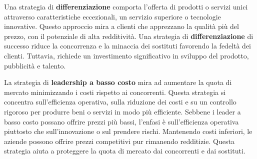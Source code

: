 \documentclass{article}
\begin{document}
Una strategia di \textbf{differenziazione} comporta l’offerta di prodotti o servizi unici attraverso caratteristiche eccezionali, un servizio superiore o tecnologie innovative. Questo approccio mira a clienti che apprezzano la qualità più del prezzo, con il potenziale di alta redditività. Una strategia di \textbf{differenziazione} di successo riduce la concorrenza e la minaccia dei sostituti favorendo la fedeltà dei clienti. Tuttavia, richiede un investimento significativo in sviluppo del prodotto, pubblicità e talento.

La strategia di \textbf{leadership a basso costo} mira ad aumentare la quota di mercato minimizzando i costi rispetto ai concorrenti. Questa strategia si concentra sull'efficienza operativa, sulla riduzione dei costi e su un controllo rigoroso per produrre beni o servizi in modo più efficiente. Sebbene i leader a basso costo possano offrire prezzi più bassi, l'enfasi è sull'efficienza operativa piuttosto che sull'innovazione o sul prendere rischi. Mantenendo costi inferiori, le aziende possono offrire prezzi competitivi pur rimanendo redditizie. Questa strategia aiuta a proteggere la quota di mercato dai concorrenti e dai sostituti.
\end{document}
